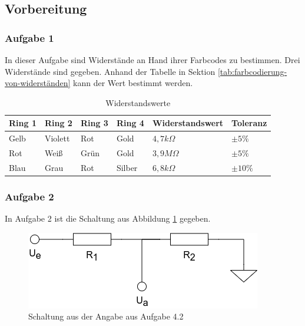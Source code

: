 \subsection{Vorbereitung}
\label{subsec:a4-vorbereitung}

\subsubsection{Aufgabe 1}

In dieser Aufgabe sind Widerstände an Hand ihrer Farbcodes zu bestimmen.
Drei Widerstände sind gegeben.
Anhand der Tabelle in Sektion \ref{tab:farbcodierung-von-widerständen} kann der Wert bestimmt werden.

\begin{table}[ht]
    \centering
    \caption{Widerstandswerte}
    \label{tab:a4-widerstandswerte}
    \begin{tabular}{| l | l | l | l | l | l |}
        \hline
        Ring 1 & Ring 2 & Ring 3 & Ring 4 & Widerstandswert & Toleranz \\
        \hline
        Gelb & Violett & Rot & Gold & $4,7k\Omega$ & $\pm5\%$ \\
        Rot & Weiß & Grün & Gold & $3,9M\Omega$ & $\pm5\%$ \\
        Blau & Grau & Rot & Silber & $6,8k\Omega$ & $\pm10\%$ \\
        \hline
    \end{tabular}
\end{table}

\subsubsection{Aufgabe 2}

In Aufgabe 2 ist die Schaltung aus Abbildung \ref{fig:schaltung-a4-2} gegeben.

\begin{figure}[ht]
    \centering
    \includegraphics[width=\textwidth]{pictures/a4-1.png}
    \caption{Schaltung aus der Angabe aus Aufgabe 4.2}
    \label{fig:schaltung-a4-2}
\end{figure}


